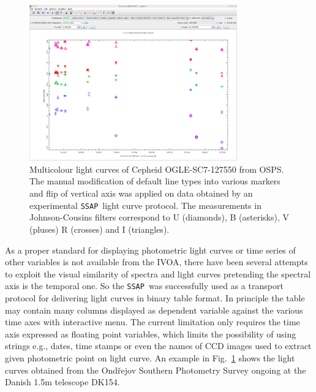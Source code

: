 \documentclass[final,authoryear,5p,times,twocolumn]{elsarticle}
\newcommand{\ssap}{\texttt{SSAP}}
\begin{document}
\begin{figure}[tbh]
\begin{center}
\includegraphics[width=0.8\textwidth]{OGLE-SC7-127550_plot.pdf}
\caption{Multicolour light curves of Cepheid OGLE-SC7-127550 from
  OSPS. The manual modification of default line types into various
  markers and flip of vertical axis was applied on data obtained by
  an experimental \ssap\ light curve protocol.
 The measurements in
  Johnson-Cousins filters correspond to U (diamonds), B (asterisks),
  V (pluses) R (crosses) and I (triangles).  }
\label{fig:OGLE-SC7-127550_plot}
\end{center}
\end{figure}

As a proper standard for displaying photometric light curves or time series
of other variables is not available from the IVOA, there have been several
attempts to exploit the visual similarity of spectra and light curves
pretending the spectral axis is the temporal one.  So the \ssap\ was
successfully used as a transport protocol for delivering light curves in
binary table format. In principle the table may contain many columns displayed
as dependent variable against the various time axes with interactive menu.
The current limitation only requires the time axis expressed as floating point
variables, which limits the possibility of using strings e.g., dates, time
stamps or even the names of CCD images used to extract given photometric point
on light curve.  An example in 
Fig.~\ref{fig:OGLE-SC7-127550_plot}
 shows the
light curves obtained  
from the Ond\v{r}ejov Southern Photometry Survey \citep{skoda_adassxxiii} ongoing at the Danish 1.5m telescope DK154.
\end{document}
